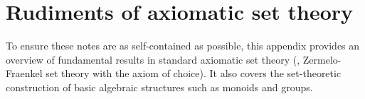 \chapter{Rudiments of axiomatic set theory}

To ensure these notes are as self-contained as possible, this appendix provides an overview of fundamental results in standard axiomatic set theory (\ie, Zermelo-Fraenkel set theory with the axiom of choice). It also covers the set-theoretic construction of basic algebraic structures such as monoids and groups. 


